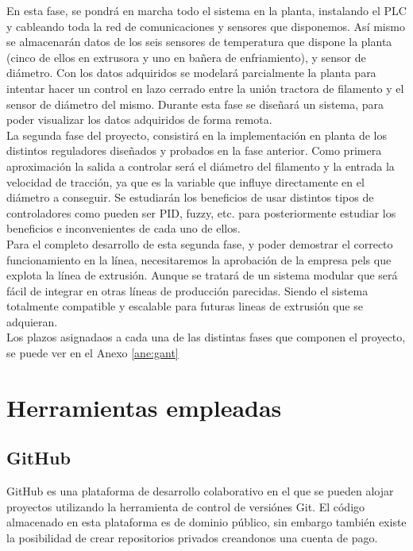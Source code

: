 En esta fase, se pondrá en marcha todo el sistema en la planta, instalando el PLC y cableando toda la red de comunicaciones y sensores que disponemos. Así mismo se almacenarán datos de los seis sensores de temperatura que dispone la planta (cinco de ellos en extrusora y uno en bañera de enfriamiento), y sensor de diámetro. Con los datos adquiridos se modelará parcialmente la planta para intentar hacer un control en lazo cerrado entre la unión tractora de filamento y el sensor de diámetro del mismo. Durante esta fase se diseñará un sistema, para poder visualizar los datos adquiridos de forma remota.\\

La segunda fase del proyecto, consistirá en la implementación en planta de los distintos reguladores diseñados y probados en la fase anterior. Como primera aproximación la salida a controlar será el diámetro del filamento y la entrada la velocidad de tracción, ya que es la variable que influye directamente en el diámetro a conseguir. Se estudiarán los beneficios de usar distintos tipos de controladores como pueden ser PID, fuzzy, etc. para posteriormente estudiar los beneficios e inconvenientes de cada uno de ellos.\\

Para el completo desarrollo de esta segunda fase, y poder demostrar el correcto funcionamiento en la línea, necesitaremos la aprobación de la empresa pels que explota la línea de extrusión. Aunque se tratará de un sistema modular que será fácil de integrar en otras líneas de producción parecidas. Siendo el sistema totalmente compatible y escalable para futuras lineas de extrusión que se adquieran.\\

Los plazos asignadaos a cada una de las distintas fases que componen el proyecto, se puede ver en el Anexo \ref{ane:gant}

\section{Herramientas empleadas}
\label{sec:herramientas}

\subsection{GitHub}
GitHub es una plataforma de desarrollo colaborativo en el que se pueden alojar proyectos utilizando la herramienta de control de versiónes Git. El código almacenado en esta plataforma es de dominio público, sin embargo también existe la posibilidad de crear repositorios privados creandonos una cuenta de pago.\\

